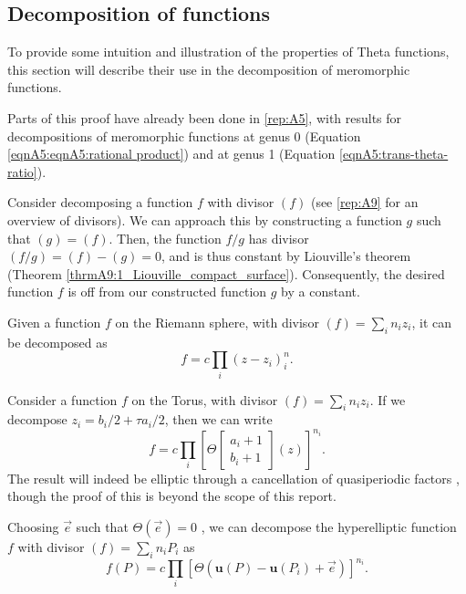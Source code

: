 \subsection{Decomposition of functions}\label{secB12:decomposition}
To provide some intuition and illustration of the properties of Theta functions, this section will describe their use in the decomposition of meromorphic functions.

Parts of this proof have already been done in \ref{rep:A5}, with results for decompositions of meromorphic functions at genus 0 (Equation \ref{eqnA5:eqnA5:rational product}) and at genus 1 (Equation \ref{eqnA5:trans-theta-ratio}).

Consider decomposing a function $f$ with divisor $(f)$ (see \ref{rep:A9} for an overview of divisors). We can approach this by constructing a function $g$ such that $(g)=(f)$. Then, the function $f/g$ has divisor $(f/g)=(f)-(g)=0$, and is thus constant by Liouville's theorem (Theorem \ref{thrmA9:1_Liouville_compact_surface}). Consequently, the desired function $f$ is off from our constructed function $g$ by a constant.

\begin{lemma}
    Given a function $f$ on the Riemann sphere, with divisor $(f)=\sum_i n_i z_i$, it can be decomposed as
    \begin{equation}
        f = c \prod_i (z-z_i)^n_i.
    \end{equation}
\end{lemma}

\begin{lemma}
    Consider a function $f$ on the Torus, with divisor $(f) = \sum_i n_i z_i$. If we decompose $z_i = b_i/2 + \tau a_i/2$, then we can write
    \begin{equation}
        f = c \prod_i \left[\Theta\begin{bmatrix}a_i+1 \\ b_i+1\end{bmatrix}(z)\right]^{n_i}.
    \end{equation}
    The result will indeed be elliptic through a cancellation of quasiperiodic factors \cite{Cha22}, though the proof of this is beyond the scope of this report.
\end{lemma}

\begin{lemma}
    Choosing $\vec e$ such that $\Theta(\vec e)=0$ \cite{Ber06}, we can decompose the hyperelliptic function $f$ with divisor $(f) = \sum_i n_i P_i$ as 
    \begin{equation}
        f(P) = c \prod_i \left[\Theta(\mathbf{u}(P) - \mathbf{u}(P_i) + \vec e)\right]^{n_i}.
    \end{equation}
\end{lemma}

